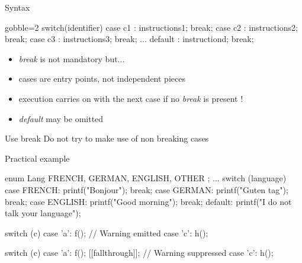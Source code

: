 \begin{frame}[fragile]
  \begin{block}{Syntax}
    \begin{cppcode*}{gobble=2}
      switch(identifier) {
        case c1 : instructions1; break;
        case c2 : instructions2; break;
        case c3 : instructions3; break;
        ...
        default : instructiond; break;
      }
    \end{cppcode*}
    \begin{itemize}
      \item {\it break} is not mandatory but...
      \item cases are entry points, not independent pieces
      \item execution carries on with the next case if no {\it break} is present !
      \item {\it default} may be omitted
    \end{itemize}
  \end{block}
  \pause
  \begin{alertblock}{Use break}
    Do not try to make use of non breaking cases
  \end{alertblock}
\end{frame}

\begin{frame}[fragile]
  \begin{exampleblock}{Practical example}
    \begin{cppcode*}{}
      enum Lang { FRENCH, GERMAN, ENGLISH, OTHER };
      ...
      switch (language) {
      case FRENCH:
        printf("Bonjour");
        break;
      case GERMAN:
        printf("Guten tag");
        break;
      case ENGLISH:
        printf("Good morning");
        break;
      default:
        printf("I do not talk your language");
      }
    \end{cppcode*}
  \end{exampleblock}
\end{frame}


\begin{frame}[fragile]
  \begin{alertblock}{}
    \begin{cppcode}
      switch (c) {
        case 'a':
          f(); // Warning emitted
        case 'c':
          h();
      }
    \end{cppcode}
  \end{alertblock}
  \begin{exampleblock}{}
    \begin{cppcode*}{}
      switch (c) {
        case 'a':
          f();
          [[fallthrough]]; // Warning suppressed
        case 'c':
          h();
      }
    \end{cppcode*}
  \end{exampleblock}
\end{frame}

